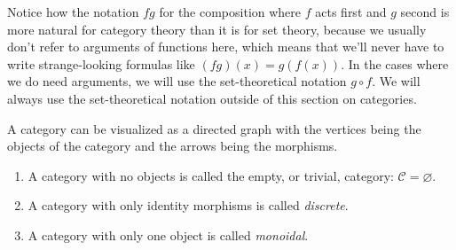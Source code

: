 \documentclass[english,letterpaper]{article}%
\numberwithin{equation}{section}
\numberwithin{figure}{section}
\numberwithin{table}{section}
\theoremstyle{definition}
\theoremstyle{definition}
\theoremstyle{definition}
\theoremstyle{plain}
\theoremstyle{plain}
\theoremstyle{plain}
\theoremstyle{plain}
\theoremstyle{remark}
\theoremstyle{remark}
\newcommand{\calC}{\mathcal{C}}
\begin{document}
Notice how the notation $fg$ for the composition where $f$ acts first and $g$ second is more natural for category theory than it is for set theory, because we usually don't refer to arguments of functions here, which means that we'll never have to write strange-looking formulas like $(fg)(x)=g(f(x))$. In the cases where we do need arguments, we will use the set-theoretical notation $g\circ f$. We will always use the set-theoretical notation outside of this section on categories.

A category can be visualized as a directed graph with the vertices
being the objects of the category and the arrows being the morphisms.
\begin{example}
\begin{enumerate}
    \item A category with no objects is called the empty, or trivial, category: $\calC=\varnothing$.
    \item A category with only identity morphisms is called \emph{discrete}.
    \item A category with only one object is called \emph{monoidal}.
\end{enumerate}
    
\end{example}
\end{document}
